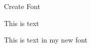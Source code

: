 \begin{ExampleBlock}{Create Font}


This is text

{\MyFont This is text in my new font}


\end{ExampleBlock}
